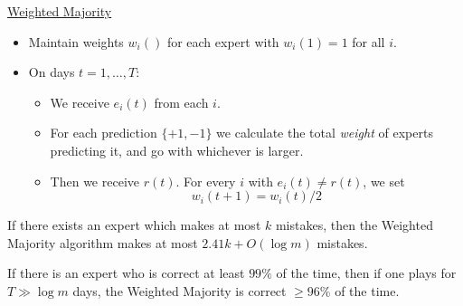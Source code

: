 \documentclass[11pt]{article}
\begin{document}
\begin{mdframed}[backgroundcolor=blue!05,topline=false,bottomline=false,leftline=false,rightline=false] 
	\underline{\sc Weighted Majority}
	\begin{itemize}
		\item Maintain weights $w_i()$ for each expert with $w_i(1) = 1$ for all $i$.
		\item On days $t=1,\ldots, T$:
		\begin{itemize}
			\item We receive $e_i(t)$ from each $i$.
					\item For each prediction $\{+1,-1\}$ we calculate the total {\em weight} of experts predicting it, and go with whichever is larger.
			\item Then we receive $r(t)$. For every $i$ with $e_i(t) \neq r(t)$, we set
			\begin{equation}
			\label{eq:halving}
			w_i(t+1) = w_i(t)/2
			\end{equation}
			
		\end{itemize} 
	\end{itemize}
\end{mdframed}

\begin{theorem}
	If there exists an expert which makes at most $k$ mistakes, then the {\sc Weighted Majority} algorithm makes at most $2.41k + O(\log m)$ mistakes.
\end{theorem}

\begin{corollary}
	If there is an expert who is correct at least $99\%$ of the time, then if one plays for $T \gg \log m$ days, the {\sc Weighted Majority} is correct
	$\ge 96\%$ of the time.
\end{corollary}
\end{document}
